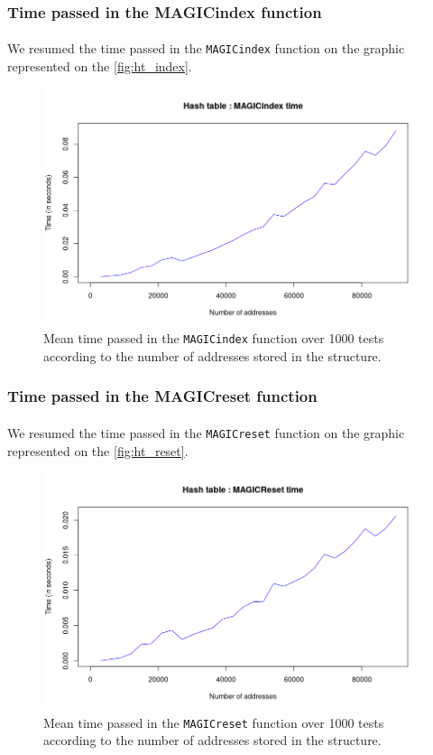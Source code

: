 \documentclass[a4paper, 11pt, oneside]{article}
\begin{document}
\subsubsection{Time passed in the MAGICindex function}
\paragraph{}We resumed the time passed in the \texttt{MAGICindex} function on the graphic represented on the \autoref{fig:ht_index}. 
\begin{figure}[H]
  \centering
  \includegraphics[scale=0.6]{plots/ht_index.png} 
  \caption{Mean time passed in the \texttt{MAGICindex} function over 1000 tests according to the number of addresses stored in the structure.}\label{fig:ht_index}
\end{figure}
\subsubsection{Time passed in the MAGICreset function}
\paragraph{}We resumed the time passed in the \texttt{MAGICreset} function on the graphic represented on the \autoref{fig:ht_reset}. 
\begin{figure}[H]
  \centering
  \includegraphics[scale=0.6]{plots/ht_reset.png} 
  \caption{Mean time passed in the \texttt{MAGICreset} function over 1000 tests according to the number of addresses stored in the structure.}\label{fig:ht_reset}
\end{figure}
\end{document}
